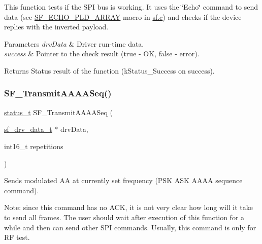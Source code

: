 This function tests if the S\+PI bus is working. It uses the \char`\"{}\+Echo\char`\"{} command to send data (see \mbox{\hyperlink{sf_8c_ab3c5eabcda72b90257fd5cc48b500a5a}{S\+F\+\_\+\+E\+C\+H\+O\+\_\+\+P\+L\+D\+\_\+\+A\+R\+R\+AY}} macro in \mbox{\hyperlink{sf_8c}{sf.\+c}}) and checks if the device replies with the inverted payload. 


\begin{DoxyParams}{Parameters}
{\em drv\+Data} & Driver run-\/time data. \\
\hline
{\em success} & Pointer to the check result (true -\/ OK, false -\/ error).\\
\hline
\end{DoxyParams}
\begin{DoxyReturn}{Returns}
Status result of the function (k\+Status\+\_\+\+Success on success). 
\end{DoxyReturn}
\mbox{\label{group__sf__functions__group_ga1ba2a22d2c43f1be64c8946e0f8e4d4f}} 
\subsubsection{\texorpdfstring{SF\_TransmitAAAASeq()}{SF\_TransmitAAAASeq()}}
{\footnotesize\ttfamily \mbox{\hyperlink{group__ksdk__common_gaaabdaf7ee58ca7269bd4bf24efcde092}{status\+\_\+t}} S\+F\+\_\+\+Transmit\+A\+A\+A\+A\+Seq (\begin{DoxyParamCaption}\item[{\mbox{\hyperlink{structsf__drv__data__t}{sf\+\_\+drv\+\_\+data\+\_\+t}} $\ast$}]{drv\+Data,  }\item[{int16\+\_\+t}]{repetitions }\end{DoxyParamCaption})}



Sends modulated AA at currently set frequency (P\+SK A\+SK A\+A\+AA sequence command). 

Note\+: since this command has no A\+CK, it is not very clear how long will it take to send all frames. The user should wait after execution of this function for a while and then can send other S\+PI commands. Usually, this command is only for RF test.


